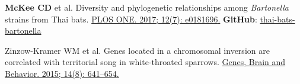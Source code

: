 \documentclass[letterpaper]{deedy-resume} %
\begin{document}
\begin{tightenumerate}
\item \textbf{McKee CD} et al. Diversity and phylogenetic relationships among \textit{Bartonella} strains from Thai bats. \href{https://doi.org/10.1371/journal.pone.0181696}{\textcolor{special}{PLOS ONE. 2017; 12(7): e0181696}.} \label{item8} \textbf{GitHub}: \href{https://github.com/clifmckee/thai-bats-bartonella}{\textcolor{special}{thai-bats-bartonella}}

\item Zinzow-Kramer WM et al. Genes located in a chromosomal inversion are correlated with territorial song in white-throated sparrows. \href{https://doi.org/10.1111/gbb.12252}{\textcolor{special}{Genes, Brain and Behavior. 2015; 14(8): 641--654}.} \label{item9}

\end{tightenumerate}
\end{document}
